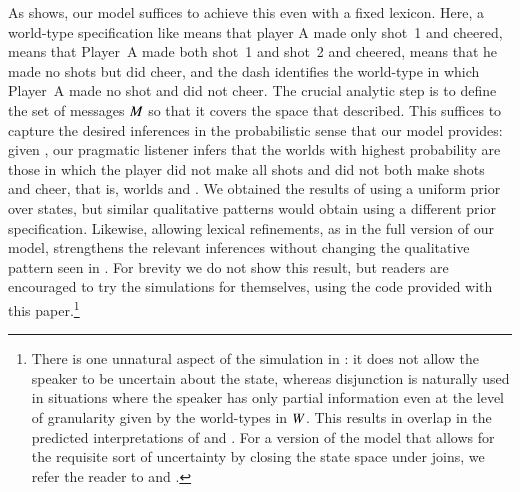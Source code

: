 \documentclass[leqno,12pt]{article}
\begin{document}
As  shows, our model suffices to achieve this
even with a fixed lexicon. Here, a world-type specification like
 means that player A made only shot~1 and cheered,
 means that Player~A made both shot~1 and
shot~2 and cheered,  means that he made no shots but did
cheer, and the dash identifies the world-type in which Player~A made
no shot and did not cheer. The crucial analytic step is to define the
set of messages $M$ so that it covers the space that
\citeauthor{Sauerland01} described. This suffices to capture the
desired inferences in the probabilistic sense that our model provides:
given , our pragmatic listener
 infers that the worlds with highest probability are
those in which the player did not make all shots and did not both make
shots and cheer, that is, worlds  and . We
obtained the results of  using a uniform prior
over states, but similar qualitative patterns would obtain using a
different prior specification.  Likewise, allowing lexical
refinements, as in the full version of our model, strengthens the
relevant inferences without changing the qualitative pattern seen in
. For brevity we do not show this result, but
readers are encouraged to try the simulations for themselves, using
the code provided with this paper.\footnote{There is one unnatural
  aspect of the simulation in : it does not
  allow the speaker to be uncertain about the state, whereas
  disjunction is naturally used in situations where the speaker has
  only partial information even at the level of granularity given by
  the world-types in $W$. This results in overlap in the
  predicted interpretations of  and . For a version of the
  model that allows for the requisite sort of uncertainty by closing
  the state space under joins, we refer the reader to
  \citealt{Bergen:Levy:Goodman:2014} and \citealt{Potts:Levy:2015}.}
  
\end{document}
